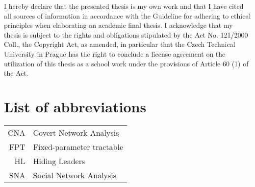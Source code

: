 \documentclass[english,bachelor,unicode]{ctufit-thesis}
\theoremstyle{plain}
\theoremstyle{definition}
\theoremstyle{remark}
\numberwithin{theorem}{chapter}
\begin{document}
\begin{declarationpage}
    I hereby declare that the presented thesis is my own work and that I have cited all sources of information in accordance with the Guideline
    for adhering to ethical principles when elaborating an academic final thesis.
    I acknowledge that my thesis is subject to the rights and obligations stipulated by the Act No. 121/2000 Coll.,
    the Copyright Act, as amended, in particular that the Czech Technical University in Prague has the right to conclude
    a license agreement on the utilization of this thesis as a school work under the provisions of Article 60 (1) of the Act.
\end{declarationpage}


\printabstractpage %


\chapter{List of abbreviations}

\begin{tabular}{rl}
    CNA  & Covert Network Analysis\\
    FPT  & Fixed-parameter tractable\\
    HL   & Hiding Leaders\\
    SNA  & Social Network Analysis
\end{tabular}


\mainmatter\mainmatterinit %








%
%

\appendix\appendixinit %


\backmatter %

\printbibliography %

\end{document}
